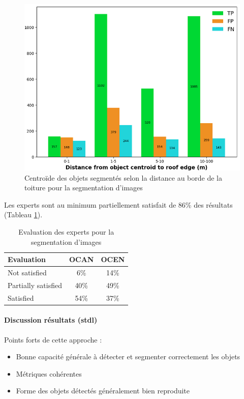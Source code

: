 \begin{figure}[H]
    \centering
    \includegraphics[width=1\linewidth]{02-main//figures/ch2/stdl_11_segmentation_image_distance.png}
    \caption{Centroïde des objets segmentés selon la distance au borde de la toiture pour la segmentation d’images  \cite{herny_detection_2024}}
    \label{fig:stdl_11_segmentation_image_distance}
\end{figure}

Les experts sont au minimum partiellement satisfait de 86\% des résultats (Tableau \ref{tab:stdl_07_segmentation_image_resultats_experts}).
\begin{table}[H]
    \centering
    \begin{tabular}{|l|c|c|}
    \hline
    Evaluation & OCAN & OCEN \\
    \hline
    Not satisfied & 6\% & 14\% \\
    Partially satisfied & 40\% & 49\% \\
    Satisfied & 54\% & 37\% \\
    \hline
    \end{tabular}
    \caption{Evaluation des experts pour la segmentation d'images}
    \label{tab:stdl_07_segmentation_image_resultats_experts}
\end{table}
\newpage
\paragraph{Discussion résultats (\acrshort{stdl})}

\par{Points forts de cette approche :}
\begin{itemize}
\item Bonne capacité générale à détecter et segmenter correctement les objets
\item Métriques cohérentes
\item Forme des objets détectés généralement bien reproduite
\end{itemize}

